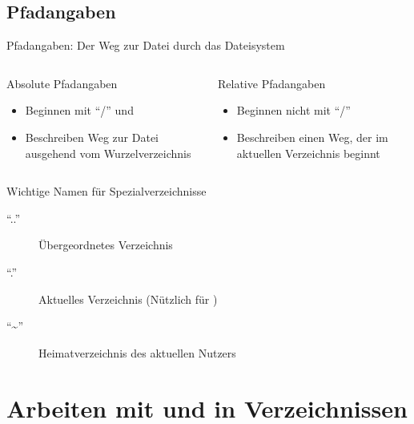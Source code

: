 \documentclass[aspectratio=43]{beamer}
\begin{document}
\subsection{Pfadangaben}
\begin{frame}{Pfadangaben: Der Weg zur Datei durch das Dateisystem}
  \begin{columns}
    \begin{column}{0.5\textwidth}
      \begin{block}{Absolute Pfadangaben}
        \begin{itemize}
          \item Beginnen mit ``/'' und 
          \item Beschreiben Weg zur Datei ausgehend vom Wurzelverzeichnis
        \end{itemize}
      \end{block}
    \end{column}
    \begin{column}{0.5\textwidth}
      \begin{block}{Relative Pfadangaben}
        \begin{itemize}
          \item Beginnen nicht mit ``/''
          \item Beschreiben einen Weg, der im aktuellen Verzeichnis beginnt
        \end{itemize}    
      \end{block}
    \end{column}
  \end{columns}
  \begin{block}{Wichtige Namen für Spezialverzeichnisse}
  \begin{description}
    \item[``..''] Übergeordnetes Verzeichnis
    \item[``.''] Aktuelles Verzeichnis (Nützlich für )
    \item[``\textasciitilde''] Heimatverzeichnis des aktuellen Nutzers
  \end{description}
  \end{block}
\end{frame}


\section{Arbeiten mit und in Verzeichnissen}
\end{document}
